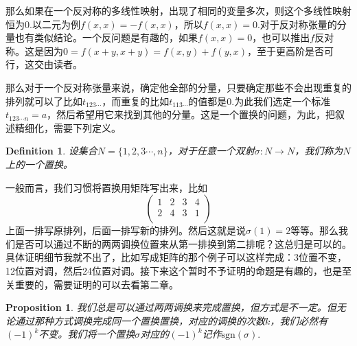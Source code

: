 \documentclass[11pt,a4paper,openany]{book}%
\theoremstyle{plain}%
\newtheorem{pro}{Proposition}[chapter]%
\newtheorem{defi}{Definition}[chapter]%
\begin{document}
那么如果在一个反对称的多线性映射，出现了相同的变量多次，则这个多线性映射恒为0.以二元为例$f(x,x)=-f(x,x)$，所以$f(x,x)=0$.对于反对称张量的分量也有类似结论。一个反问题是有趣的，如果$f(x,x)=0$，也可以推出$f$反对称。这是因为$0=f(x+y,x+y)=f(x,y)+f(y,x)$，至于更高阶是否可行，这交由读者。

那么对于一个反对称张量来说，确定他全部的分量，只要确定那些不会出现重复的排列就可以了比如$t_{123\cdots}$，而重复的比如$t_{113\cdots}$的值都是0.为此我们选定一个标准$t_{123\cdots n}=a$，然后希望用它来找到其他的分量。这是一个置换的问题，为此，把叙述精细化，需要下列定义。
\begin{defi}
设集合$N=\{1,2,3\cdots,n\}$，对于任意一个双射$\sigma:N \rightarrow N$，我们称为$N$上的一个置换。
\end{defi}
一般而言，我们习惯将置换用矩阵写出来，比如
\[
\begin{pmatrix}
1& 2 &3 &4\\
2& 4& 3&1\\
\end{pmatrix}
\]
上面一排写原排列，后面一排写新的排列。然后这就是说$\sigma(1)=2$等等。那么我们是否可以通过不断的两两调换位置来从第一排换到第二排呢？这总归是可以的。具体证明细节我就不出了，比如写成矩阵的那个例子可以这样完成：3位置不变，12位置对调，然后24位置对调。接下来这个暂时不予证明的命题是有趣的，也是至关重要的，需要证明的可以去看第二章。
\begin{pro}
我们总是可以通过两两调换来完成置换，但方式是不一定。但无论通过那种方式调换完成同一个置换置换，对应的调换的次数$k$，我们必然有$(-1)^k$不变。我们将一个置换$\sigma$对应的$(-1)^k$记作$\mathrm{sgn}(\sigma).$
\end{pro}
\end{document}
